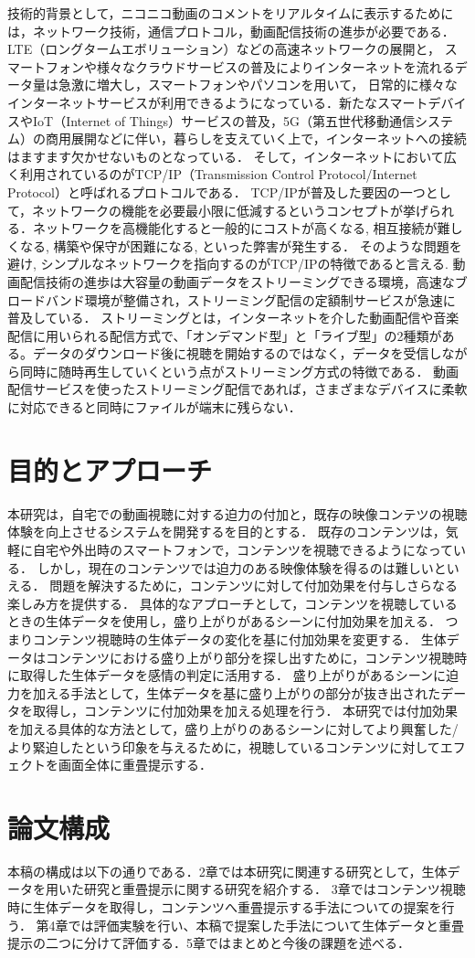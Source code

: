 技術的背景として，ニコニコ動画のコメントをリアルタイムに表示するためには，ネットワーク技術，通信プロトコル，動画配信技術の進歩が必要である．
LTE（ロングタームエボリューション）などの高速ネットワークの展開と， スマートフォンや様々なクラウドサービスの普及によりインターネットを流れるデータ量は急激に増大し，スマートフォンやパソコンを用いて，
日常的に様々なインターネットサービスが利用できるようになっている．新たなスマートデバイスやIoT（Internet of Things）サービスの普及，5G（第五世代移動通信システム）の商用展開などに伴い，暮らしを支えていく上で，インターネットへの接続はますます欠かせないものとなっている．
そして，インターネットにおいて広く利用されているのがTCP/IP（Transmission Control Protocol/Internet Protocol）と呼ばれるプロトコルである．
TCP/IPが普及した要因の一つとして，ネットワークの機能を必要最小限に低減するというコンセプトが挙げられる．ネットワークを高機能化すると一般的にコストが高くなる, 相互接続が難しくなる, 構築や保守が困難になる, といった弊害が発生する．
そのような問題を避け, シンプルなネットワークを指向するのがTCP/IPの特徴であると言える.
動画配信技術の進歩は大容量の動画データをストリーミングできる環境，高速なブロードバンド環境が整備され，ストリーミング配信の定額制サービスが急速に普及している．
ストリーミングとは，インターネットを介した動画配信や音楽配信に用いられる配信方式で、「オンデマンド型」と「ライブ型」の2種類がある。データのダウンロード後に視聴を開始するのではなく，データを受信しながら同時に随時再生していくという点がストリーミング方式の特徴である．
動画配信サービスを使ったストリーミング配信であれば，さまざまなデバイスに柔軟に対応できると同時にファイルが端末に残らない．

\section{目的とアプローチ}
本研究は，自宅での動画視聴に対する迫力の付加と，既存の映像コンテツの視聴体験を向上させるシステムを開発するを目的とする．
既存のコンテンツは，気軽に自宅や外出時のスマートフォンで，コンテンツを視聴できるようになっている．
しかし，現在のコンテンツでは迫力のある映像体験を得るのは難しいといえる．
問題を解決するために，コンテンツに対して付加効果を付与しさらなる楽しみ方を提供する．
具体的なアプローチとして，コンテンツを視聴しているときの生体データを使用し，盛り上がりがあるシーンに付加効果を加える．
つまりコンテンツ視聴時の生体データの変化を基に付加効果を変更する．
生体データはコンテンツにおける盛り上がり部分を探し出すために，コンテンツ視聴時に取得した生体データを感情の判定に活用する．
盛り上がりがあるシーンに迫力を加える手法として，生体データを基に盛り上がりの部分が抜き出されたデータを取得し，コンテンツに付加効果を加える処理を行う．
本研究では付加効果を加える具体的な方法として，盛り上がりのあるシーンに対してより興奮した/より緊迫したという印象を与えるために，視聴しているコンテンツに対してエフェクトを画面全体に重畳提示する．

\section{論文構成}
本稿の構成は以下の通りである．2章では本研究に関連する研究として，生体データを用いた研究と重畳提示に関する研究を紹介する．
3章ではコンテンツ視聴時に生体データを取得し，コンテンツへ重畳提示する手法についての提案を行う．
第4章では評価実験を行い、本稿で提案した手法について生体データと重畳提示の二つに分けて評価する．5章ではまとめと今後の課題を述べる．

